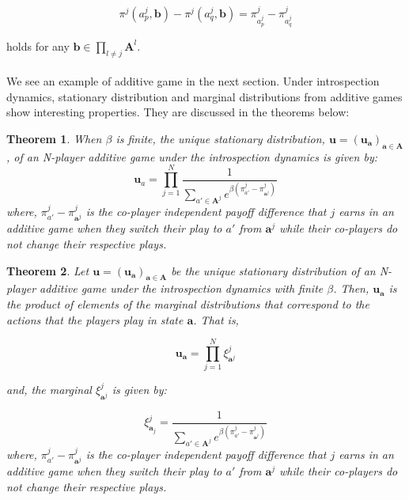 \documentclass[11pt]{article}
\theoremstyle{plainCl1}
\newtheorem{theorem}{Theorem}
\theoremstyle{plainCl2}
\newcommand{\A}{\mathbf{A}}
\newcommand{\abf}{\mathbf{a}}
\newcommand{\ubf}{\mathbf{u}}
\begin{document}
\begin{equation}
\pi^j(a^j_p, \mathbf{b}) - \pi^j(a^j_q, \mathbf{b}) = \pi^j_{a^j_p} - \pi^j_{a^j_q}
\label{Eq:additive games property}
\end{equation}

\noindent holds for any $\mathbf{b} \in \prod_{l \neq j} \A^l$. 
\\ \\
We see an example of additive game in the next section. Under introspection dynamics, stationary distribution and marginal distributions from additive games show interesting properties. They are discussed in the theorems below: 

\begin{theorem}
When $\beta$ is finite, the unique stationary distribution, $\ubf = (\ubf_\abf)_{\abf \in \A}$, of an N-player additive game under the introspection dynamics is given by: 
\begin{equation}
\ubf_a = \prod_{j=1}^N \frac{1}{\displaystyle \sum_{a' \in \A^j} e^{\beta \left( \pi^j_{a'} -  \pi^j_{\abf^j} \right) }} 
\label{Eq:additive-game-stationary-distribution}
\end{equation}
where, $\pi^j_{a'} - \pi^j_{\abf^j}$ is the co-player independent payoff difference that $j$  earns in an additive game when they switch their play to $a'$ from $\abf^j$ while their co-players do not change their respective plays.
\label{Th:additive-games-stationary-dist}
\end{theorem}

\begin{theorem}
Let $\ubf = (\ubf_\abf)_{\abf \in \A}$ be the unique stationary distribution of an N-player additive game under the introspection dynamics with finite $\beta$. Then, $\ubf_\abf$ is the product of elements of the marginal distributions that correspond to the actions that the players play in state $\abf$. That is, 

\begin{equation}
\ubf_\abf = \prod_{j = 1}^N \xi^j_{\abf^j}
\label{Eq:additive-game-products}
\end{equation}

\noindent and, the marginal $\xi^j_{\abf^j}$ is given by: 

\begin{equation}
\xi^j_{\abf_j} = \frac{1}{\displaystyle \sum_{a' \in \A^j} e^{\beta \left( \pi^j_{a'} -  \pi^j_{\abf^j} \right) }} 
\label{Eq:marginal-at-additive-game}
\end{equation}
\noindent where, $\pi^j_{a'} - \pi^j_{\abf^j}$ is the co-player independent payoff difference that $j$  earns in an additive game when they switch their play to $a'$ from $\abf^j$ while their co-players do not change their respective plays.
\label{Th:additive-game-product-of-marginals}
\end{theorem}
\end{document}
